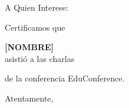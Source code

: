 \documentclass{letter}[18pt]
\date{Quito, 30 de marzo 2019}
\begin{document}

\begin{letter}{A Quien Interese:}

\opening{\vspace{0.5cm}Certificamos que\\}

{\centering \Large \bf [NOMBRE]\\}
\vspace{0.5cm}
asistió a las charlas\\
\vspace{0.5cm}


de la conferencia EduConference.

\lipsum[66]


\closing{Atentamente,}
\end{letter}
\end{document}
